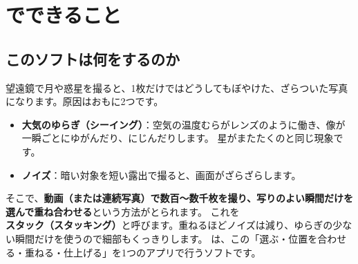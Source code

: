 \chapter{\LS でできること}

\section{このソフトは何をするのか}

望遠鏡で月や惑星を撮ると、1枚だけではどうしてもぼやけた、ざらついた写真になります。原因はおもに2つです。

\begin{itemize}
  \item \textbf{大気のゆらぎ（シーイング）}：空気の温度むらがレンズのように働き、像が一瞬ごとにゆがんだり、にじんだりします。
        星がまたたくのと同じ現象です。
  \item \textbf{ノイズ}：暗い対象を短い露出で撮ると、画面がざらざらします。
\end{itemize}

そこで、\textbf{動画（または連続写真）で数百〜数千枚を撮り、写りのよい瞬間だけを選んで重ね合わせる}という方法がとられます。
これを\textbf{スタック（スタッキング）}と呼びます。重ねるほどノイズは減り、ゆらぎの少ない瞬間だけを使うので細部もくっきりします。
\LS は、この「選ぶ・位置を合わせる・重ねる・仕上げる」を1つのアプリで行うソフトです。

